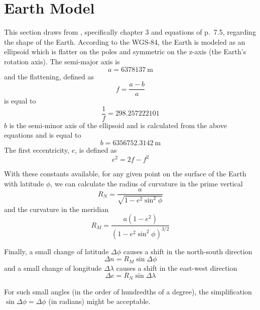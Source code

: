 \section{Earth Model}\label{sec:earth_model}

This section draws from \cite{Mulaire2000}, specifically chapter 3 and equations of p.~7.5, regarding the shape of the Earth.
According to the WGS-84, the Earth is modeled as an ellipsoid which is flatter on the poles and symmetric on the z-axis (the Earth's rotation axis). The semi-major axis is
\begin{equation}\label{eq:majorAxis}
	a=\SI{6378137}{\m}
\end{equation}
and the flattening, defined as
\begin{equation}
	f = \frac{a-b}{a}
\end{equation}
is equal to
\begin{equation}
	\frac{1}{f} = 298.257222101
\end{equation}
$b$ is the semi-minor axis of the ellipsoid and is calculated from the above equations and is equal to
\begin{equation}
	b=\SI{6356752.3142}{\m}
\end{equation}
The first eccentricity, $e$, is defined as
\begin{equation}
	e^2=2f-f^2
\end{equation}

With these constants available, for any given point on the surface of the Earth with latitude $\phi$, we can calculate the radius of curvature in the prime vertical
\begin{equation}
	R_N=\frac{a}{\sqrt{1-e^2\sin^2\phi}}
\end{equation}
and the curvature in the meridian
\begin{equation}
	R_M = \frac{a(1-e^2)}{(1-e^2\sin^2\phi)^{3/2}}
\end{equation}

Finally, a small change of latitude $\Delta \phi$ causes a shift in the north-south direction
\begin{equation}
	\Delta n = R_M \sin \Delta \phi
\end{equation}
and a small change of longitude $\Delta \lambda$ causes a shift in the east-west direction
\begin{equation}
	\Delta e = R_N \sin \Delta \lambda
\end{equation}

For such small angles (in the order of hundredths of a degree), the simplification $\sin \Delta \phi = \Delta \phi$ (in radians) might be acceptable.

